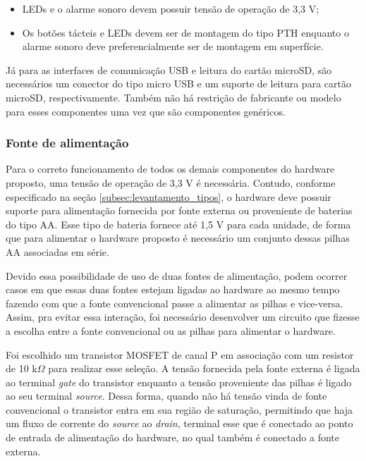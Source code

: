 \begin{itemize}
    \item LEDs e o alarme sonoro devem possuir tensão de operação de 3,3 V;
    \item Os botões tácteis e LEDs devem ser de montagem do tipo PTH enquanto o alarme sonoro deve preferencialmente ser de montagem em superfície.
\end{itemize}

Já para as interfaces de comunicação USB e leitura do cartão microSD, são necessários um conector do tipo micro USB e um suporte de leitura para cartão microSD, respectivamente. Também não há restrição de fabricante ou modelo para esses componentes uma vez que são componentes genéricos. 


\subsubsection{Fonte de alimentação}\label{subsubsec:fonte_alimentacao}

Para o correto funcionamento de todos os demais componentes do hardware proposto, uma tensão de operação de 3,3 V é necessária. Contudo, conforme especificado na seção \ref{subsec:levantamento_tipos}, o hardware deve possuir suporte para alimentação fornecida por fonte externa ou proveniente de baterias do tipo AA. Esse tipo de bateria fornece até 1,5 V para cada unidade, de forma que para alimentar o hardware proposto é necessário um conjunto dessas pilhas AA associadas em série.

Devido essa possibilidade de uso de duas fontes de alimentação, podem ocorrer casos em que essas duas fontes estejam ligadas ao hardware ao mesmo tempo fazendo com que a fonte convencional passe a alimentar as pilhas e vice-versa. Assim, pra evitar essa interação, foi necessário desenvolver um circuito que fizesse a escolha entre a fonte convencional ou as pilhas para alimentar o hardware. 

Foi escolhido um transistor \gls{MOSFET} de canal P em associação com um resistor de 10 k$\Omega$ para realizar esse seleção. A tensão fornecida pela fonte externa é ligada ao terminal \textit{gate} do transistor enquanto a tensão proveniente das pilhas é ligado ao seu terminal \textit{source}. Dessa forma, quando não há tensão vinda de fonte convencional o transistor entra em sua região de saturação, permitindo que haja um fluxo de corrente do \textit{source} ao \textit{drain}, terminal esse que é conectado ao ponto de entrada de alimentação do hardware, no qual também é conectado a fonte externa. 

